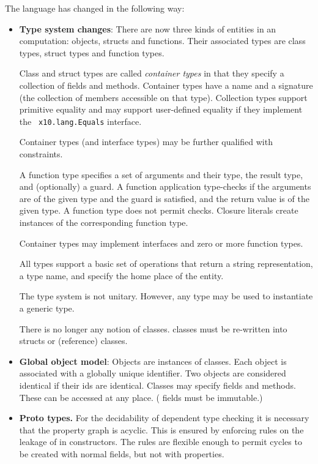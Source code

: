 \documentclass[12pt,twoside,notitlepage]{report}
\begin{document}
The language has changed in the following way:
\begin{itemize}

\item {\bf Type system changes}: There are now three kinds of entities
  in an \Xten{} computation: objects, structs and functions. Their
  associated types are class types, struct types and function
  types. 

  Class and struct types are called {\em container types} in that they
  specify a collection of fields and methods. Container types have a
  name and a signature (the collection of members accessible on that
  type). Collection types support primitive equality \Xcd{==} and may
  support user-defined equality if they implement the {\tt
    x10.lang.Equals} interface. 

  Container types (and interface types) may be further qualified with
  constraints.

  A function type specifies a set of arguments and their type, the
  result type, and (optionally) a guard. A function application
  type-checks if the arguments are of the given type and the guard is
  satisfied, and the return value is of the given type.  A function
  type does not permit \Xcd{==} checks. Closure literals create
  instances of the corresponding function type.

  Container types may implement interfaces and zero or more function
  types.

  All types support a basic set of operations that return a string
  representation, a type name, and specify the home place of the entity.

  The type system is not unitary. However, any type may be used to
  instantiate a generic type. 

  There is no longer any notion of  classes. 
  classes must be re-written into structs or (reference) classes. 

\item {\bf Global object model}: Objects are instances of
  classes. Each object is associated with a globally unique
  identifier. Two objects are considered identical \Xcd{==} if their
  ids are identical. Classes may specify  fields and
  methods. These can be accessed at any place. ( fields
  must be immutable.)

\item{\bf Proto types.} For the decidability of dependent type
  checking it is necessary that the property graph is acyclic. This is
  ensured by enforcing rules on the leakage of  in
  constructors. The rules are flexible enough to permit cycles to be
  created with normal fields, but not with properties.


\end{itemize}
\end{document}

